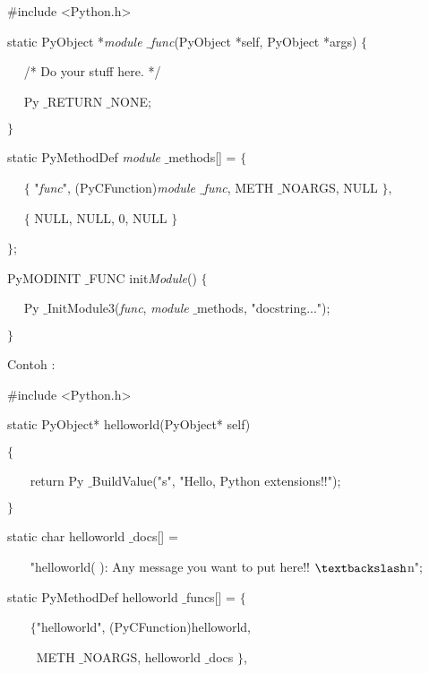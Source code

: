 \documentclass{wileySix}
\begin{document}
\begin{myEnumerate}
\begin{myEnumerate}
{\begin{myEnumerate}
\noindent 
$  \#  $include <Python.h> \par
\vspace{12pt}
\noindent 
static PyObject *\textit{module $  \_  $func}(PyObject *self, PyObject *args)  $  \{  $ \par
\noindent 
~~ /* Do your stuff here. */ \par
\noindent 
~~ Py $  \_  $RETURN $  \_  $NONE; \par
\noindent 
$  \}  $ \par
\vspace{12pt}
\noindent 
static PyMethodDef \textit{module} $  \_  $methods[] =  $  \{  $ \par
\noindent 
~~  $  \{  $ "\textit{func}", (PyCFunction)\textit{module $  \_  $func}, METH $  \_  $NOARGS, NULL  $  \}  $, \par
\noindent 
~~  $  \{  $ NULL, NULL, 0, NULL  $  \}  $ \par
\noindent 
$  \}  $; \par
\vspace{12pt}
\noindent 
PyMODINIT $  \_  $FUNC init\textit{Module}()  $  \{  $ \par
\noindent 
~~ Py $  \_  $InitModule3(\textit{func}, \textit{module} $  \_  $methods, "docstring..."); \par
\noindent 
$  \}  $ \par
\vspace{12pt}
\noindent 
Contoh : \par
\noindent 
$  \#  $include <Python.h> \par
\vspace{12pt}
\noindent 
static PyObject* helloworld(PyObject* self) \par
\noindent 
$  \{  $ \par
\noindent 
~~~ return Py $  \_  $BuildValue("s", "Hello, Python extensions!!"); \par
\noindent 
$  \}  $ \par
\vspace{12pt}
\noindent 
static char helloworld $  \_  $docs[] = \par
\noindent 
~~~ "helloworld( ): Any message you want to put here!! $  \textbackslash  $n"; \par
\vspace{12pt}
\noindent 
static PyMethodDef helloworld $  \_  $funcs[] =  $  \{  $ \par
\noindent 
~~~  $  \{  $"helloworld", (PyCFunction)helloworld,  \par
\noindent 
~~~~ METH $  \_  $NOARGS, helloworld $  \_  $docs $  \}  $, \par

\end{myEnumerate}}
\end{myEnumerate}
\end{myEnumerate}
\end{document}
